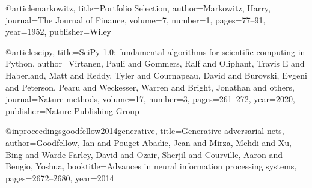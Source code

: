 @article{markowitz,
  title={Portfolio Selection},
  author={Markowitz, Harry},
  journal={The Journal of Finance},
  volume={7},
  number={1},
  pages={77--91},
  year={1952},
  publisher={Wiley}
}

@article{scipy,
  title={SciPy 1.0: fundamental algorithms for scientific computing in Python},
  author={Virtanen, Pauli and Gommers, Ralf and Oliphant, Travis E and Haberland, Matt and Reddy, Tyler and Cournapeau, David and Burovski, Evgeni and Peterson, Pearu and Weckesser, Warren and Bright, Jonathan and others},
  journal={Nature methods},
  volume={17},
  number={3},
  pages={261--272},
  year={2020},
  publisher={Nature Publishing Group}
}

@inproceedings{goodfellow2014generative,
  title={Generative adversarial nets},
  author={Goodfellow, Ian and Pouget-Abadie, Jean and Mirza, Mehdi and Xu, Bing and Warde-Farley, David and Ozair, Sherjil and Courville, Aaron and Bengio, Yoshua},
  booktitle={Advances in neural information processing systems},
  pages={2672--2680},
  year={2014}
}